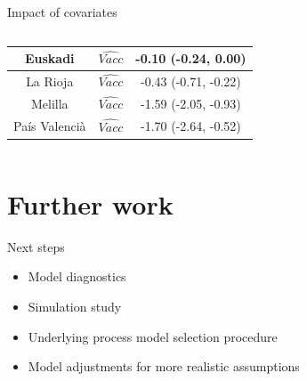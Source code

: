 \documentclass[aspectratio=169,usepdftitle=true]{beamer}
\begin{document}
\begin{frame}{Impact of covariates}
\begin{columns}
\begin{column}{0.6\textwidth}
\begin{table}
{\begin{tabular}{ccc}
\midrule
Euskadi    & $\hat{Vacc}$  & -0.10 (-0.24, 0.00) \\
\midrule
La Rioja    & $\hat{Vacc}$  & -0.43 (-0.71, -0.22) \\
\midrule
Melilla   & $\hat{Vacc}$  & -1.59 (-2.05, -0.93) \\
\midrule
Pa\'is Valenci\`a    & $\hat{Vacc}$  & -1.70 (-2.64, -0.52) \\
\bottomrule
\end{tabular}}
\end{table}
\end{column}
\end{columns}
\end{frame}

\section{Further work}
\begin{frame}{Next steps}
\begin{itemize}
 \item Model diagnostics
 \item Simulation study
 \item Underlying process model selection procedure
 \item Model adjustments for more realistic assumptions
\end{itemize}
\end{frame}
\end{document}

